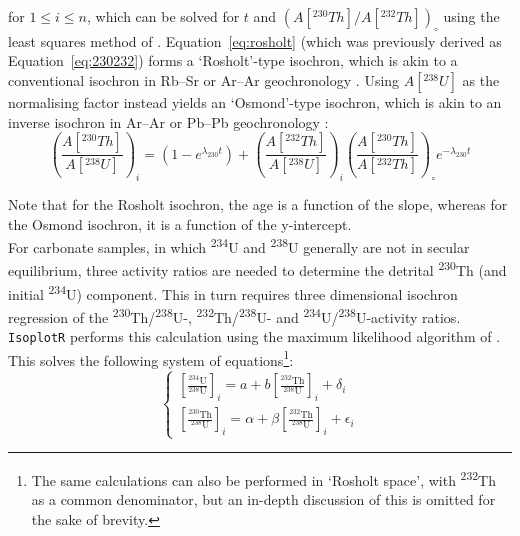 \begin{refsection}
\noindent for $1 \leq i \leq n$, which can be solved for $t$ and
$\left(A[{}^{230}Th]/A[{}^{232}Th]\right)_{\!\circ}$ using the least
squares method of \citet{york2004}. Equation~\ref{eq:rosholt} (which
was previously derived as Equation~\ref{eq:230232}) forms a
`Rosholt'-type isochron, which is akin to a conventional isochron in
Rb--Sr or Ar--Ar geochronology \citep{rosholt1976}. Using
$A[{}^{238}U]$ as the normalising factor instead yields an
`Osmond'-type isochron, which is akin to an inverse isochron in Ar--Ar
or Pb--Pb geochronology \citep{osmond1970, ludwig2003b}:
\begin{equation}
  \left(\frac{A[{}^{230}Th]}{A[{}^{238}U]}\right)_i =
  \left(1-e^{\lambda_{230}t}\right) +
  \left(\frac{A[{}^{232}Th]}{A[{}^{238}U]}\right)_i
  \left(\frac{A[{}^{230}Th]}{A[{}^{232}Th]}\right)_\circ
  e^{-\lambda_{230}t}
  \label{eq:osmond}
\end{equation}

Note that for the Rosholt isochron, the age is a function of the
slope, whereas for the Osmond isochron, it is a function of the
y-intercept.\\

For carbonate samples, in which \textsuperscript{234}U and
\textsuperscript{238}U generally are not in secular equilibrium, three
activity ratios are needed to determine the detrital
\textsuperscript{230}Th (and initial \textsuperscript{234}U)
component. This in turn requires three dimensional isochron regression
of the \textsuperscript{230}Th/\textsuperscript{238}U-,
\textsuperscript{232}Th/\textsuperscript{238}U- and
\textsuperscript{234}U/\textsuperscript{238}U-activity
ratios. \texttt{IsoplotR} performs this calculation using the maximum
likelihood algorithm of \citet{ludwig1994}. This solves the following
system of equations\footnote{The same calculations can also be
performed in `Rosholt space', with \textsuperscript{232}Th as a common
denominator, but an in-depth discussion of this is omitted for the
sake of brevity.}:
\begin{equation}
  \begin{cases}
    \left[\frac{{}^{234}\mbox{U}}{{}^{238}\mbox{U}}\right]_i =
    a + b \left[\frac{{}^{232}\mbox{Th}}{{}^{238}\mbox{U}}\right]_i +
    \delta_i \\
    \left[\frac{{}^{230}\mbox{Th}}{{}^{238}\mbox{U}}\right]_i =
    \alpha + \beta \left[\frac{{}^{232}\mbox{Th}}{{}^{238}\mbox{U}}\right]_i +
    \epsilon_i
  \end{cases}
  \label{eq:titterington}
\end{equation}


\end{refsection}
